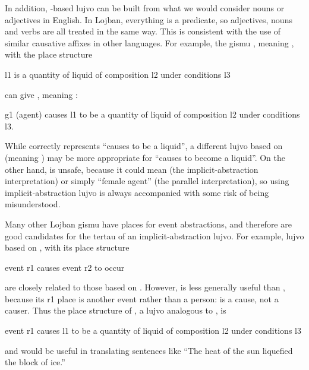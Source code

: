In addition, -based lujvo can be built from what we
    would consider nouns or adjectives in English. In Lojban,
    everything is a predicate, so adjectives, nouns and verbs are
    all treated in the same way. This is consistent with the use of
    similar causative affixes in other languages. For example, the
    gismu , meaning , with the place
    structure
\begin{example}
l1 is a quantity of liquid of composition l2\n
\T	under conditions l3
\end{example}

{\noindent}can give , meaning :
\begin{example}
g1 (agent) causes l1 to be a quantity of liquid\n
\T	of composition l2 under conditions l3.
\end{example}

While  correctly represents ``causes to be a
    liquid'', a different lujvo based on  (meaning
    ) may be more appropriate for ``causes to become a
    liquid''. On the other hand,  is unsafe, because it
    could mean 
    (the implicit-abstraction interpretation) or simply ``female
    agent'' (the parallel interpretation), so using
    implicit-abstraction lujvo is always accompanied with some risk
    of being misunderstood.

Many other Lojban gismu have places for event abstractions,
    and therefore are good candidates for the tertau of an
    implicit-abstraction lujvo. For example, lujvo based on
    , with its place structure
\begin{example}
event r1 causes event r2 to occur
\end{example}

{\noindent}are closely related to those based on . However,
     is less generally useful than , because its
    r1 place is another event rather than a person:  is
    a cause, not a causer. Thus the place structure of
    , a lujvo analogous to , is
\begin{example}
event r1 causes l1 to be a quantity of liquid\n
\T	of composition l2 under conditions l3
\end{example}

{\noindent}and would be useful in translating sentences like ``The heat of
    the sun liquefied the block of ice.'' 

